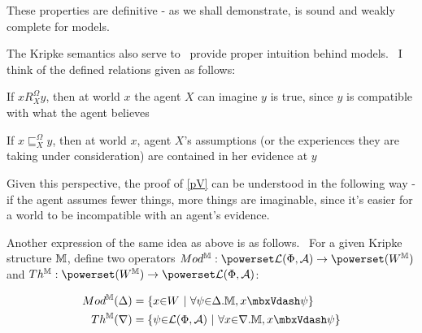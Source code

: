 % 
% 
% 

These properties are definitive - as we shall demonstrate,  is
sound and weakly complete for  models.

The Kripke semantics also serve to \ provide proper intuition behind
 models. \ I think of the defined relations given as follows:
\begin{itemizedot}
  \item If $x R^{\Omega}_X y$, then at world $x$ the agent $X$ can imagine $y$
  is true, since $y$ is compatible with what the agent believes
  
  \item If $x \sqsubseteq^{\Omega}_X y$, then at world $x$, agent $X$'s
  assumptions (or the experiences they are taking under consideration) are
  contained in her evidence at $y$
\end{itemizedot}
Given this perspective, the proof of \ref{pV} can be understood in the
following way - if the agent assumes fewer things, more things are imaginable,
since it's easier for a world to be incompatible with an agent's evidence.

Another expression of the same idea as above is as follows. \ For a given
Kripke structure $\mathbbm{M}$, define two operators $Mod^{\mathbbm{M}}
: \powerset  \mathcal{L} (\Phi, \mathcal{A}) \rightarrow \powerset
(W^{\mathbbm{M}})$ and $Th^{\mathbbm{M}} : \powerset
(W^{\mathbbm{M}}) \rightarrow \powerset \mathcal{L} (\Phi, \mathcal{A})$:

\begin{align*}
  Mod^{{\mathbbm{M}}}({\Delta}) &
  =\{x{\in}W{\ }|{\ }{\forall}{\psi}{\in}{\Delta}.
  {\mathbbm{M}},x{\Vdash}{\psi}\}\\
  Th^{{\mathbbm{M}}}({\nabla}) & =\{{\psi}{\in}\mathcal{L}({\Phi},
  \mathcal{A}){\ }|{\ }{\forall}x{\in}{\nabla}.
  {\mathbbm{M}},x{\Vdash}{\psi}\}
\end{align*}

